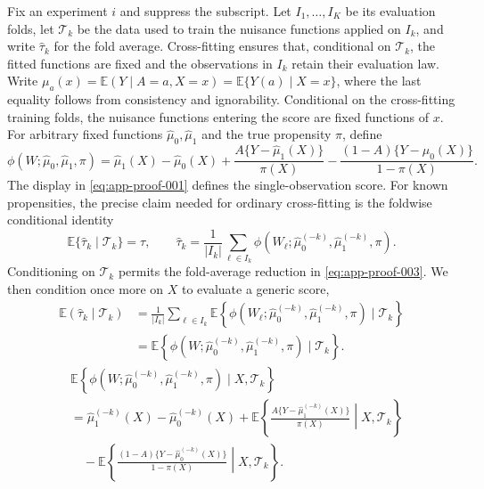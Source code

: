 \documentclass[11pt]{article}
\numberwithin{equation}{section}
\newcommand{\E}{\mathbb E}
\newcommand{\1}{\mathbf 1}
\begin{document}
Fix an experiment \(i\) and suppress the subscript.  Let \(I_1,\ldots,I_K\) be its evaluation folds, let \(\mathcal T_k\) be the data used to train the nuisance functions applied on \(I_k\), and write \(\widehat\tau_k\) for the fold average.  Cross-fitting ensures that, conditional on \(\mathcal T_k\), the fitted functions are fixed and the observations in \(I_k\) retain their evaluation law.  Write \(\mu_a(x)=\E(Y\mid A=a,X=x)=\E\{Y(a)\mid X=x\}\), where the last equality follows from consistency and ignorability.  Conditional on the cross-fitting training folds, the nuisance functions entering the score are fixed functions of \(x\).  For arbitrary fixed functions \(\widehat\mu_0,\widehat\mu_1\) and the true propensity \(\pi\), define
\begin{equation}
\label{eq:app-proof-001}
\phi(W;\widehat\mu_0,\widehat\mu_1,\pi)
  =
  \widehat\mu_1(X)-\widehat\mu_0(X)
  +\frac{A\{Y-\widehat\mu_1(X)\}}{\pi(X)}
  -\frac{(1-A)\{Y-\widehat\mu_0(X)\}}{1-\pi(X)}.
\end{equation}
The display in \eqref{eq:app-proof-001} defines the single-observation score.
For known propensities, the precise claim needed for ordinary cross-fitting is the foldwise conditional identity 
\begin{equation}
\label{eq:app-proof-002}
\E\{\widehat\tau_k\mid\mathcal T_k\}=\tau,
\qquad
\widehat\tau_k
=\frac{1}{|I_k|}\sum_{\ell\in I_k}
\phi(W_\ell;\widehat\mu_0^{(-k)},\widehat\mu_1^{(-k)},\pi).
\end{equation}
Conditioning on \(\mathcal T_k\) permits the fold-average reduction in \eqref{eq:app-proof-003}.  We then condition once more on \(X\) to evaluate a generic score,
\begin{equation}
\label{eq:app-proof-003}
\begin{aligned}
\E(\widehat\tau_k\mid\mathcal T_k)
&=\frac{1}{|I_k|}\sum_{\ell\in I_k}
  \E\!\left\{
  \phi(W_\ell;\widehat\mu_0^{(-k)},\widehat\mu_1^{(-k)},\pi)
  \mid\mathcal T_k
  \right\}\\
&=\E\!\left\{
  \phi(W;\widehat\mu_0^{(-k)},\widehat\mu_1^{(-k)},\pi)
  \mid\mathcal T_k
  \right\}.
\end{aligned}
\end{equation}
\begin{equation}
\label{eq:app-proof-004}
\begin{aligned}
&\E\!\left\{
\phi(W;\widehat\mu_0^{(-k)},\widehat\mu_1^{(-k)},\pi)
\mid X,\mathcal T_k
\right\}\\
&=\widehat\mu_1^{(-k)}(X)-\widehat\mu_0^{(-k)}(X)
+\E\!\left\{\frac{A\{Y-\widehat\mu_1^{(-k)}(X)\}}{\pi(X)}
\middle|X,\mathcal T_k\right\}\\
&\quad-\E\!\left\{\frac{(1-A)\{Y-\widehat\mu_0^{(-k)}(X)\}}{1-\pi(X)}
\middle|X,\mathcal T_k\right\}.
\end{aligned}
\end{equation}
\end{document}
